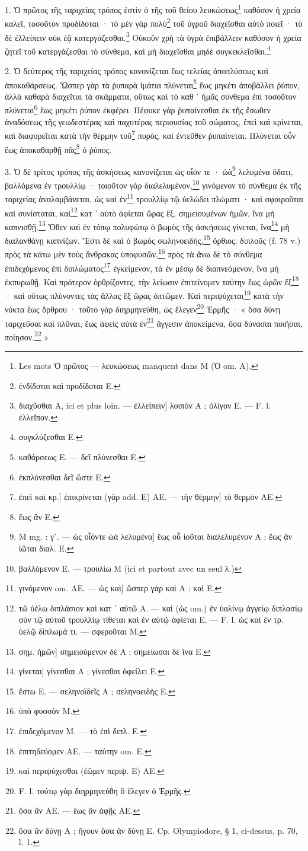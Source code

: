 \documentclass[a4paper, 11pt, oneside, polutonikogreek, french]{article}
\begin{document}
1. Ὁ πρῶτος τῆς ταριχείας τρόπος ἐστὶν ὁ τῆς τοῦ θείου λευκώσεως\footnote{Les mots Ὁ πρῶτος --- λευκώσεως manquent dans M (Ὁ om. A).} καθόσον ἡ χρεία καλεῖ, τοσοῦτον προδίδοται · τὸ μὲν γὰρ πολὺ\footnote{ἐνδίδοται καὶ προδίδοται E.} τοῦ ὑγροῦ διαχεῖσθαι αὐτὸ ποιεῖ · τὸ δὲ ἐλλείπειν οὐκ ἐᾷ κατεργάζεσθαι.\footnote{διαχῦσθαι A, ici et plus loin. --- ἐλλείπειν] λοιπὸν A ; ὀλίγον E. --- F. l. ἐλλεῖπον.} Οὐκοῦν χρὴ τὰ ὑγρὰ ἐπιβάλλειν καθόσον ἡ χρεία ζητεῖ τοῦ κατεργάζεσθαι τὸ σύνθεμα, καὶ μὴ διαχεῖσθαι μηδὲ συγκεκλεῖσθαι.\footnote{συγκλύζεσθαι E.}

2. Ὁ δεύτερος τῆς ταριχείας τρόπος κανονίζεται ἕως τελείας ἀποπλύσεως καὶ ἀποκαθάρσεως. Ὥσπερ γὰρ τὰ ῥυπαρὰ ἱμάτια πλύνεται\footnote{καθάρσεως E. --- δεῖ πλύνεσθαι E.} ἕως μηκέτι ἀποβάλλει ῥύπον, ἀλλὰ καθαρὰ διαχεῖται τὰ σκάμματα, οὕτως καὶ τὸ καθ ᾽ ἡμᾶς σύνθεμα ἐπὶ τοσοῦτον πλύνεται\footnote{ἐκπλύνεσθαι δεῖ ὥστε E.} ἕως μηκέτι ῥύπον ἐκφέρει. Πέφυκε γὰρ ῥυπαίνεσθαι ἐκ τῆς ἔσωθεν ἀναδόσεως τῆς γεωδεστέρας καὶ παχυτέρας περιουσίας τοῦ σώματος, ἐπεὶ καὶ κρίνεται, καὶ διαφορεῖται κατὰ τὴν θέρμην τοῦ\footnote{ἐπεὶ καὶ κρ.] ἐπικρίνεται (γὰρ add. E) AE. --- τὴν θέρμην] τὸ θερμὸν AE.} πυρὸς, καὶ ἐντεῦθεν ῥυπαίνεται. Πλύνεται οὖν ἕως ἀποκαθαρθῇ πᾶς\footnote{ἕως ἂν E.} ὁ ῥύπος.

3. Ὁ δὲ τρίτος τρόπος τῆς ἀσκήσεως κανονίζεται ὡς οἷόν τε · ὠὰ\footnote{M mg. : γʹ. --- ὡς οἷόντε ὠὰ λελυμένα] ἕως οὗ ἰοῦται διαλελυμένον A ; ἕως ἂν ἰῶται διαλ. E.} λελυμένα ὕδατι, βαλλόμενα ἐν τρουλλίῳ · τοιοῦτον γὰρ διαλελυμένον,\footnote{βαλλόμενον E. --- τρουλίω M (ici et partout avec un seul λ.)} γινόμενον τὸ σύνθεμα ἐκ τῆς ταριχείας ἀναλαμβάνεται, ὡς καὶ ἐν\footnote{γινόμενον om. AE. --- ὡς καὶ] ὥσπερ γὰρ καὶ A ; καὶ E.} τρουλλίῳ τῷ ὑελώδει πλώματι · καὶ σφαιροῦται καὶ συνίσταται, καὶ\footnote{τῶ ὑέλω διπλάσιον καὶ κατ ᾽ αὐτῶ A. --- καὶ (ὡς om.) ἐν ὑαλίνῳ ἀγγείῳ διπλασίῳ σὺν τῷ αὐτοῦ τρουλλίῳ τίθεται καὶ ἐν αὐτῷ ἀφίεται E. --- F. l. ὡς καὶ ἐν τρ. ὑελῷ δίπλωμά τι. --- σφεροῦται M.} κατ ᾽ αὐτὸ ἀφίεται ὥρας ἓξ, σημειουμένων ἡμῶν, ἵνα μὴ καπνισθῇ.\footnote{σημ. ἡμῶν] σημειούμενον δὲ A ; σημείωσαι δὲ ἵνα E.} Ὅθεν καὶ ἐν τόπῳ πολυφώτῳ ὁ βωμὸς τῆς ἀσκήσεως γίνεται, ἵνα\footnote{γίνεται] γίνεσθαι A ; γίνεσθαι ὀφείλει E.} μὴ διαλανθάνῃ καπνίζων. Ἔστι δὲ καὶ ὁ βωμὸς σωληνοειδὴς,\footnote{ἔστω E. --- σεληνοϊδεῖς A ; σεληνοειδὴς E.} ὄρθιος, διπλοῦς (f. 78 v.) πρὸς τὰ κάτω μὲν τοὺς ἄνθρακας ὑποφυσῶν,\footnote{ὑπὸ φυσσὸν M.} πρὸς τὰ ἄνω δὲ τὸ σύνθεμα ἐπιδεχόμενος ἐπὶ διπλώματος\footnote{ἐπιδεχόμενον M. --- τὸ ἐπὶ διπλ. E.} ἐγκείμενον, τὰ ἐν μέσῳ δὲ διαπνεόμενον, ἵνα μὴ ἐκπυρωθῇ. Καί πρότερον ὀρθρίζοντες, τὴν λείωσιν ἐπιτείνομεν ταύτην ἕως ὡρῶν ἕξ\footnote{ἐπιτηδεύομεν AE. --- ταύτην om. E.} · καὶ οὕτως πλύνοντες τὰς ἄλλας ἓξ ὥρας ὀπτῶμεν. Καὶ περιψύχεται\footnote{καὶ περιψύχεσθαι (ἐῶμεν περιψ. E) AE.} κατὰ τὴν νύκτα ἕως ὄρθρου · τοῦτο γὰρ διηρμηνεύθη, ὡς ἔλεγεν\footnote{F. l. τούτῳ γὰρ διηρμηνεύθη ὃ ἔλεγεν ὁ Ἑρμῆς.} Ἑρμῆς · « ὅσα δύνῃ ταριχεῦσαι καὶ πλῦναι, ἕως ἀφεὶς αὐτὰ ἐν\footnote{ὅσα ἂν AE. --- ἕως ἂν ἀφῇς AE.} ἄγγεσιν ἀποκείμενα, ὅσα δύνασαι ποιῆσαι, ποίησον.\footnote{ὅσα ἂν δύνῃ A ; ἤγουν ὅσα ἂν δύνῃ E. Cp. Olympiodore, § 1, ci-dessus, p. 70, l. 1.} »
\end{document}
